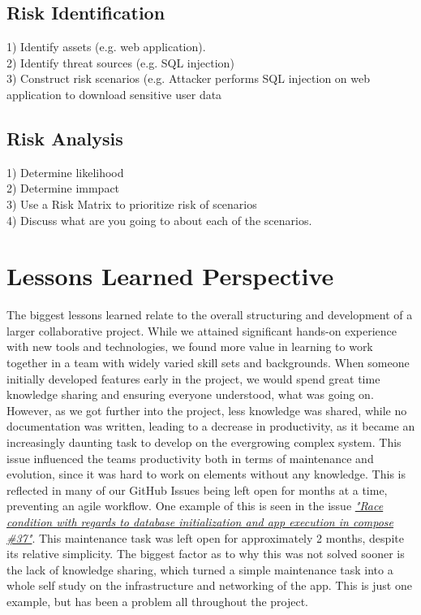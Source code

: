 \documentclass[11pt]{article}
\begin{document}
\subsection{Risk Identification}
1) Identify assets (e.g. web application).\\
2) Identify threat sources (e.g. SQL injection) \\
3) Construct risk scenarios (e.g. Attacker performs SQL injection on web application to download sensitive user data

\subsection{Risk Analysis}
1) Determine likelihood \\
2) Determine immpact \\
3) Use a Risk Matrix to prioritize risk of scenarios \\
4) Discuss what are you going to about each of the scenarios.  


\section{Lessons Learned Perspective}
The biggest lessons learned relate to the overall structuring and development of a larger collaborative project. While we attained significant hands-on experience with new tools and technologies, we found more value in learning to work together in a team with widely varied skill sets and backgrounds. When someone initially developed features early in the project, we would spend great time knowledge sharing and ensuring everyone understood, what was going on. However, as we got further into the project, less knowledge was shared, while no documentation was written, leading to a decrease in productivity, as it became an increasingly daunting task to develop on the evergrowing complex system. This issue influenced the teams productivity both in terms of maintenance and evolution, since it was hard to work on elements without any knowledge. This is reflected in many of our GitHub Issues being left open for months at a time, preventing an agile workflow. One example of this is seen in the issue \href{https://github.com/group-o-minitwit-2024/MiniTwit/issues/37}{\textit{"Race condition with regards to database initialization and app execution in compose \#37"}}. This maintenance task was left open for approximately 2 months, despite its relative simplicity. The biggest factor as to why this was not solved sooner is the lack of knowledge sharing, which turned a simple maintenance task into a whole self study on the infrastructure and networking of the app. This is just one example, but has been a problem all throughout the project. \\
\end{document}
